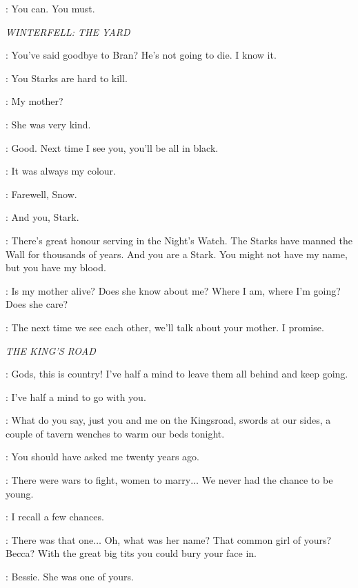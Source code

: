 \NED: You can. You must. 

\scene

\textit{WINTERFELL: THE YARD}


\ROBB: You've said goodbye to Bran? He's not going to die. I know it. 

\JON: You Starks are hard to kill. 

\ROBB: My mother? 

\JON: She was very kind. 

\ROBB: Good. Next time I see you, you'll be all in black. 

\JON: It was always my colour. 

\ROBB: Farewell, Snow. 

\JON: And you, Stark. 


\NED: There's great honour serving in the Night's Watch. The Starks have manned the Wall for thousands of years. And you are a Stark. You might not have my name, but you have my blood. 

\JON: Is my mother alive? Does she know about me? Where I am, where I'm going? Does she care? 

\NED: The next time we see each other, we'll talk about your mother. I promise. 

\scene

\textit{THE KING'S ROAD}


\ROBERT: Gods, this is country! I've half a mind to leave them all behind and keep going. 

\NED: I've half a mind to go with you. 

\ROBERT: What do you say, just you and me on the Kingsroad, swords at our sides, a couple of tavern wenches to warm our beds tonight. 

\NED: You should have asked me twenty years ago. 

\ROBERT: There were wars to fight, women to marry$\ldots$ We never had the chance to be young. 

\NED: I recall a few chances. 

\ROBERT: There was that one$\ldots$ Oh, what was her name? That common girl of yours? Becca? With the great big tits you could bury your face in. 

\NED: Bessie. She was one of yours. 

